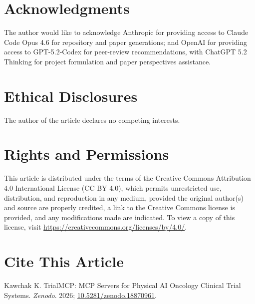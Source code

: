 \documentclass[10pt,letterpaper]{article}
\begin{document}
\newpage



\section*{Acknowledgments}

The author would like to acknowledge Anthropic for providing access to Claude Code Opus 4.6 for repository and paper generations; and OpenAI for providing access to GPT-5.2-Codex for peer-review recommendations, with ChatGPT 5.2 Thinking for project formulation and paper perspectives assistance.

\section*{Ethical Disclosures}

The author of the article declares no competing interests.

\section*{Rights and Permissions}

This article is distributed under the terms of the Creative Commons Attribution 4.0 International License (CC BY 4.0), which permits unrestricted use, distribution, and reproduction in any medium, provided the original author(s) and source are properly credited, a link to the Creative Commons license is provided, and any modifications made are indicated. To view a copy of this license, visit \url{https://creativecommons.org/licenses/by/4.0/}.

\section*{Cite This Article}

Kawchak K. TrialMCP: MCP Servers for Physical AI Oncology Clinical Trial Systems. \textit{Zenodo}. 2026; \href{https://doi.org/10.5281/zenodo.18870961}{10.5281/zenodo.18870961}.
\end{document}
